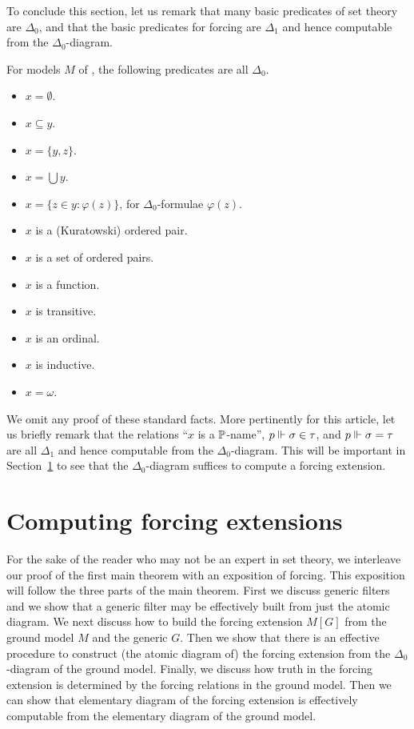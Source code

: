 \documentclass{amsart}
\begin{document}
To conclude this section, let us remark that many basic predicates of set theory are $\Delta_0$, and that the basic predicates for forcing are $\Delta_1$ and hence computable from the $\Delta_0$-diagram.

\begin{lemma}
\label{lemma:Delta1}
For models $M$ of \ZFC, the following predicates are all $\Delta_0$.
\begin{multicols}{2}
\begin{itemize}
\item $x=\emptyset$.
\item $x \subseteq y$.
\item $x = \{y,z\}$.
\item $x = \bigcup y$.
\item $x = \{ z \in y : \varphi(z) \}$, for $\Delta_0$-formulae $\varphi(z)$.
\item $x$ is a (Kuratowski) ordered pair.
\item $x$ is a set of ordered pairs.
\item $x$ is a function.
\item $x$ is transitive.
\item $x$ is an ordinal.
\item $x$ is inductive.
\item $x=\omega$.
\end{itemize}
\end{multicols}
\end{lemma}

We omit any proof of these standard facts. More pertinently for this article, let us briefly remark that the relations ``$x$ is a $\P$-name'', $p \forces \sigma \in \tau$, and $p \forces \sigma = \tau$ are all $\Delta_1$ and hence computable from the $\Delta_0$-diagram. This will be important in Section~\ref{Section.Computing-forcing-extensions} to see that the $\Delta_0$-diagram suffices to compute a forcing extension.

\section{Computing forcing extensions}\label{Section.Computing-forcing-extensions}

For the sake of the reader who may not be an expert in set theory, we interleave our proof of the first main theorem with an exposition of forcing. This exposition will follow the three parts of the main theorem. First we discuss generic filters and we show that a generic filter may be effectively built from just the atomic diagram. We next discuss how to build the forcing extension $M[G]$ from the ground model $M$ and the generic $G$. Then we show that there is an effective procedure to construct (the atomic diagram of) the forcing extension from the $\Delta_0$-diagram of the ground model. Finally, we discuss how truth in the forcing extension is determined by the forcing relations in the ground model. Then we can show that elementary diagram of the forcing extension is effectively computable from the elementary diagram of the ground model.
\end{document}
